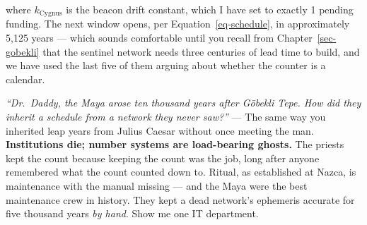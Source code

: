 \documentclass[
  english,
  11pt,
  letterpaper,
]{scrbook}
\begin{document}
where \(k_{\text{Cygnus}}\) is the beacon drift constant, which I have
set to exactly 1 pending funding. The next window opens, per
Equation~\ref{eq-schedule}, in approximately 5,125 years --- which
sounds comfortable until you recall from Chapter~\ref{sec-gobekli} that
the sentinel network needs three centuries of lead time to build, and we
have used the last five of them arguing about whether the counter is a
calendar.

\begin{tcolorbox}[enhanced jigsaw, arc=.35mm, bottomrule=.15mm, bottomtitle=1mm, breakable, colback=white, colbacktitle=quarto-callout-note-color!10!white, colframe=quarto-callout-note-color-frame, coltitle=black, left=2mm, leftrule=.75mm, opacityback=0, opacitybacktitle=0.6, rightrule=.15mm, title=\textcolor{quarto-callout-note-color}{\faInfo}\hspace{0.5em}{Objection, handled}, titlerule=0mm, toprule=.15mm, toptitle=1mm]

\emph{``Dr.~Daddy, the Maya arose ten thousand years after Göbekli Tepe.
How did they inherit a schedule from a network they never saw?''} ---
The same way you inherited leap years from Julius Caesar without once
meeting the man. \textbf{Institutions die; number systems are
load-bearing ghosts.} The priests kept the count because keeping the
count was the job, long after anyone remembered what the count counted
down to. Ritual, as established at Nazca, is maintenance with the manual
missing --- and the Maya were the best maintenance crew in history. They
kept a dead network's ephemeris accurate for five thousand years
\emph{by hand}. Show me one IT department.

\end{tcolorbox}
\end{document}
